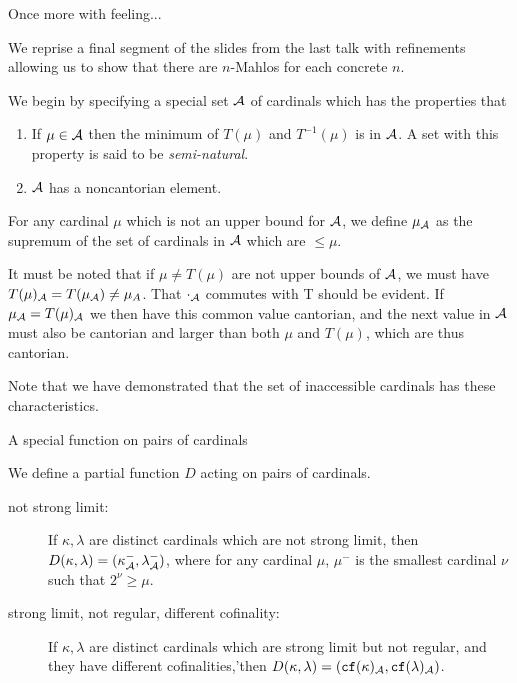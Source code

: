 \documentclass{slides}
\begin{document}
\begin{slide}

{\Large Once more with feeling...}

We reprise a final segment of the slides from the last talk with refinements allowing us to show that there are $n$-Mahlos for each concrete $n$.

We begin by specifying a special set $\cal A$  of cardinals which has the properties that

\begin{enumerate}

\item If $\mu \in {\cal A}$ then the minimum of $T(\mu)$ and $T^{-1}(\mu)$ is in $\cal A$.  A set with this property is said to be {\em semi-natural\/}.

\item $\cal A$ has a noncantorian element.

\end{enumerate}

For any cardinal $\mu$ which is not an upper bound for $\cal A$, we define $\mu_{\cal A}$ as the supremum of the set of cardinals in $\cal A$ which are $\leq \mu$.

It must be noted that if $\mu \neq T(\mu)$ are not upper bounds of $\cal A$, we must have $T(\mu)_{\cal A}=T(\mu_{\cal A}) \neq \mu_A$.  That $\cdot_{\cal A}$ commutes with T should be evident.  If $\mu_{\cal A} = T(\mu)_{\cal A}$ we then have this common value cantorian, and the next value in $\cal A$ must also be cantorian and larger than 
both $\mu$ and $T(\mu)$, which are thus cantorian.

Note that we have demonstrated that the set of inaccessible cardinals has these characteristics.


\end{slide}

\begin{slide}

{\Large A special function on pairs of cardinals}

We define a partial function $D$ acting on pairs of cardinals.

\begin{description}

\item[not strong limit:]  If $\kappa,\lambda$ are distinct cardinals which are not strong limit, then $D(\kappa,\lambda) = (\kappa^-_{\cal A},\lambda^-_{\cal A})$, where for any cardinal $\mu$, $\mu^-$ is the smallest cardinal $\nu$ such that $2^{\nu}\geq \mu$.

\item[strong limit, not regular, different cofinality:]  If $\kappa,\lambda$ are distinct cardinals which are strong limit but not regular, and they have different cofinalities,'then $D(\kappa,\lambda)=({\tt cf}(\kappa)_{\cal A},{\tt cf}(\lambda)_{\cal A})$.

\end{description}

\end{slide}
\end{document}
